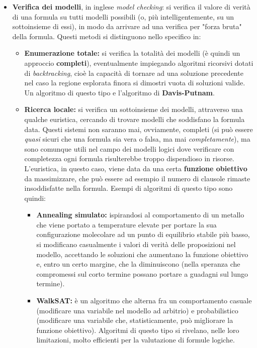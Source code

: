 \documentclass[a4paper,11pt]{article}
\begin{document}
\begin{itemize}
	\item \textbf{Verifica dei modelli}, in inglese \textit{model checking}: si verifica il valore di verità di una formula su tutti modelli possibili (o, più intelligentemente, su un sottoinsieme di essi), in modo da arrivare ad una verifica per "forza bruta" della formula.
		Questi metodi si distinguono nello specifico in:
		\begin{itemize}
			\item \textbf{Enumerazione totale:} si verifica la totalità dei modelli (è quindi un approccio \textbf{completi}), eventualmente impiegando algoritmi ricorsivi dotati di \textit{backtracking}, cioè la capacità di tornare ad una soluzione precedente nel caso la regione esplorata finora si dimostri vuota di soluzioni valide.
				Un algoritmo di questo tipo e l'algoritmo di \textbf{Davis-Putnam}.
			\item \textbf{Ricerca locale:} si verifica un sottoinsieme dei modelli, attraverso una qualche euristica, cercando di trovare modelli che soddisfano la formula data. Questi sistemi non saranno mai, ovviamente, completi (si può essere \textit{quasi} sicuri che una formula sia vera o falsa, ma mai \textit{completamente}), ma sono comunque utili nel campo dei modelli logici dove verificare con completezza ogni formula risulterebbe troppo dispendioso in risorse.
				L'euristica, in questo caso, viene data da una certa \textbf{funzione obiettivo} da massimizzare, che può essere ad esempio il numero di clausole rimaste insoddisfatte nella formula.
				Esempi di algoritmi di questo tipo sono quindi:
				\begin{itemize}
					\item \textbf{Annealing simulato:} ispirandosi al comportamento di un metallo che viene portato a temperature elevate per portare la sua configurazione molecolare ad un punto di equilibrio stabile più basso, si modificano casualmente i valori di verità delle proposizioni nel modello, accettando le soluzioni che aumentano la funzione obiettivo e, entro un certo margine, che la diminuiscono (nella speranza che compromessi sul corto termine possano portare a guadagni sul lungo termine).
					\item \textbf{WalkSAT:} è un algoritmo che alterna fra un comportamento casuale (modificare una variabile nel modello ad arbitrio) e probabilistico (modificare una variabile che, statisticamente, può migliorare la funzione obiettivo). Algoritmi di questo tipo si rivelano, nelle loro limitazioni, molto efficienti per la valutazione di formule logiche.

\end{itemize}
\end{itemize}
\end{itemize}
\end{document}
